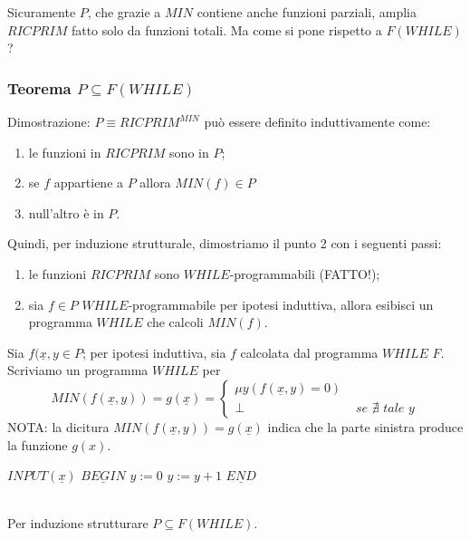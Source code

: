\documentclass{article}
\begin{document}
Sicuramente $P$, che grazie a $MIN$ contiene anche funzioni parziali, amplia $RICPRIM$ fatto solo da funzioni totali. Ma come si pone rispetto a $F(WHILE)$?
\subsubsection{Teorema $P \subseteq F(WHILE)$}
Dimostrazione: $P \equiv RICPRIM^{MIN}$ può essere definito induttivamente come:
\begin{enumerate}
	\item le funzioni in $RICPRIM$ sono in $P$;
	\item se $f$ appartiene a $P$ allora $MIN(f) \in P$
	\item null'altro è in $P$.
\end{enumerate} 

Quindi, per induzione strutturale, dimostriamo il punto 2 con i seguenti passi:
\begin{enumerate}
	\item le funzioni $RICPRIM$ sono $WHILE$-programmabili (FATTO!);
	\item sia $f \in P$ $WHILE$-programmabile per ipotesi induttiva, allora esibisci un programma $WHILE$ che calcoli $MIN(f)$.
\end{enumerate}

Sia $f(\underline{x},y \in P$; per ipotesi induttiva, sia $f$ calcolata dal programma $WHILE$ $F$. Scriviamo un programma $WHILE$ per
\begin{displaymath}
	MIN(f(\underline{x},y))=g(\underline{x})=
	\begin{cases}
		\mu y (f(\underline{x},y)=0) & \\
		\perp &\textit{ se }\nexists  \textit{ tale } y
	\end{cases}
\end{displaymath}
NOTA: la dicitura $MIN(f(\underline{x},y))=g(\underline{x})$ indica che la parte sinistra produce la funzione $g(x)$.
\begin{algorithm}[h]
        \begin{algorithmic}[1]
        		 \State $INPUT(\underline{x})$
        		 \State $\underline{BEGIN}$ 
        		 \State $y:=0$ 
        		  
        		 	\State $y:=y+1$
        		 \EndWhile
        		 \State $\underline{END}$
        \end{algorithmic}
    \end{algorithm}
    \\
Per induzione strutturare $P \subseteq F(WHILE)$.
\end{document}
